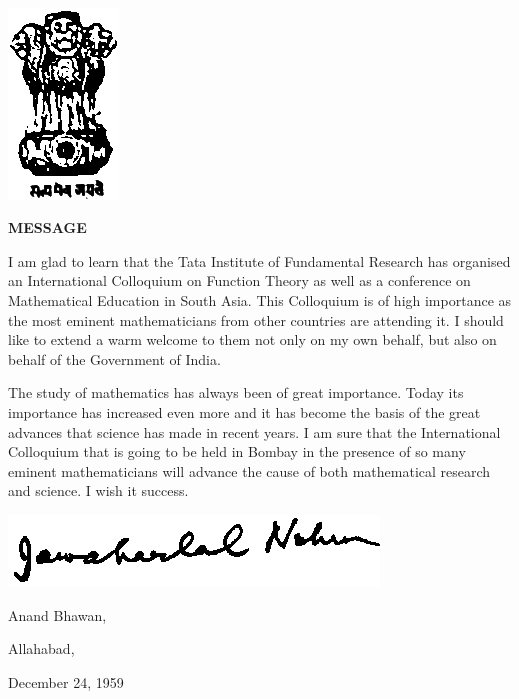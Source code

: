 \newpage

~ 

\vskip 0.9cm

\includegraphics{fig2.eps}

\vskip 0.3cm

\thispagestyle{empty}
\begin{center}
\textbf{\Large{MESSAGE}}
\end{center}

I am glad to learn that the Tata Institute of Fundamental Research has
organised an International Colloquium on Function Theory as well as a
conference on Mathematical Education in South Asia. This Colloquium is
of high importance as the most eminent mathematicians from other
countries are attending it. I should like to extend a warm welcome to
them not only on my own behalf, but also on behalf of the Government
of India.


The study of mathematics has always been of great importance. Today
its importance has increased even more and it has become the basis of
the great advances that science has made in recent years. I am sure
that the International Colloquium that is going to be held in Bombay
in the presence of so many eminent mathematicians will advance the
cause of both mathematical research and science. I wish it success.

\bigskip

\hfill\includegraphics{fig1.eps}



\bigskip
\bigskip

\noindent
Anand Bhawan,

\noindent
Allahabad,

\noindent
December 24, 1959
